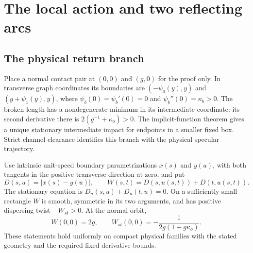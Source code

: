 \section{The local action and two reflecting arcs}\label{sec:local}
\subsection{The physical return branch}
Place a normal contact pair at $(0,0)$ and $(g,0)$ for the proof only.
In transverse graph coordinates its boundaries are
$(-\psi_0(y),y)$ and $(g+\psi_1(y),y)$, where
$\psi_b(0)=\psi_b'(0)=0$ and $\psi_b''(0)=\kappa_b>0$.
The broken length has a nondegenerate minimum in its intermediate
coordinate: its second derivative there is $2(g^{-1}+\kappa_o)>0$.
The implicit-function theorem gives a unique stationary intermediate
impact for endpoints in a smaller fixed box. Strict channel clearance
identifies this branch with the physical specular trajectory.

Use intrinsic unit-speed boundary parametrizations $x(s)$ and $y(u)$,
with both tangents in the positive transverse direction at zero, and put
\begin{equation}\label{eq:action}
 D(s,u)=|x(s)-y(u)|,\qquad
 W(s,t)=D(s,u(s,t))+D(t,u(s,t)).
\end{equation}
The stationary equation is $D_u(s,u)+D_u(t,u)=0$. On a sufficiently
small rectangle $W$ is smooth, symmetric in its two arguments, and has
positive dispersing twist $-W_{st}>0$. At the normal orbit,
\[
 W(0,0)=2g,\qquad W_{st}(0,0)=-\frac1{2g(1+g\kappa_o)}.
\]
These statements hold uniformly on compact physical families with the
stated geometry and the required fixed derivative bounds.


